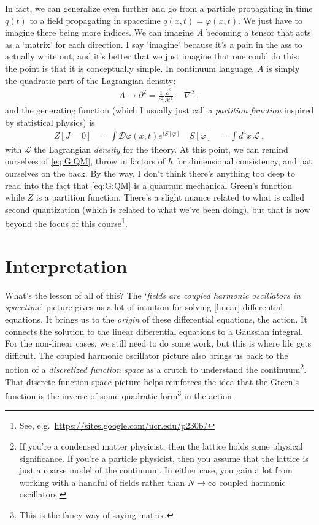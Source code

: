 In fact, we can generalize even further and go from a particle propagating in time $q(t)$ to a field propagating in spacetime $q(x,t) = \varphi(x,t)$. We just have to imagine there being more indices. We can imagine $A$ becoming a tensor that acts as a `matrix' for each direction. I say `imagine' because it's a pain in the ass to actually write out, and it's better that we just imagine that one could do this: the point is that it is conceptually simple. 
In continuum language, $A$ is simply the quadratic part of the Lagrangian density:
\begin{align}
	A\to \partial^2 = \frac{1}{c^2} \frac{\partial^2}{\partial t^2} - \nabla^2 \ ,
\end{align}
and the generating function (which I usually just call a \emph{partition function} inspired by statistical physics) is
\begin{align}
	Z[J=0] &= \int \mathcal D\varphi(x,t) e^{iS[\varphi]} \ 
	&
	S[\varphi] &= \int d^4x \, \mathcal L \ ,
\end{align}
with $\mathcal L$ the Lagrangian \emph{density} for the theory. At this point, we can remind ourselves of \eqref{eq:G:QM}, throw in factors of $\hbar$ for dimensional consistency, and pat ourselves on the back. By the way, I don't think there's anything too deep to read into the fact that \eqref{eq:G:QM} is a quantum mechanical Green's function while $Z$ is a partition function. There's a slight nuance related to what is called second quantization (which is related to what we've been doing), but that is now beyond the focus of this course\footnote{See, e.g.~\url{https://sites.google.com/ucr.edu/p230b/}}.

\section{Interpretation}

What's the lesson of all of this? The `\emph{fields are coupled harmonic oscillators in spacetime}' picture gives us a lot of intuition for solving [linear] differential equations. It brings us to the \emph{origin} of these differential equations, the action. It connects the solution to the linear differential equations to a Gaussian integral. For the non-linear cases, we still need to do some work, but this is where life gets difficult. The coupled harmonic oscillator picture also brings us back to the notion of a \emph{discretized function space} as a crutch to understand the continuum\footnote{If you're a condensed matter physicist, then the lattice holds some physical significance. If you're a particle physicist, then you assume that the lattice is just a coarse model of the continuum. In either case, you gain a lot from working with a handful of fields rather than $N\to \infty$ coupled harmonic oscillators.}. That discrete function space picture helps reinforces the idea that the Green's function is the inverse of some quadratic form\footnote{This is the fancy way of saying matrix.} in the action. 

